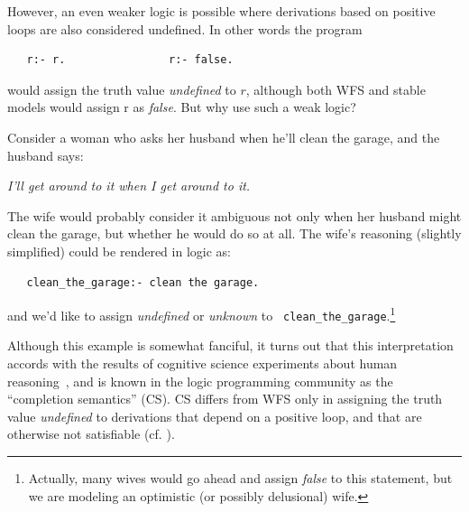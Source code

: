 However, an even weaker logic is possible where derivations based on
positive loops are also considered undefined.  In other words the
program
\begin{verbatim}
   r:- r.                r:- false.
\end{verbatim}
would assign the truth value {\em undefined} to $r$, although both WFS
and stable models would assign r as {\em false}.  But why use such a
weak logic?

Consider a woman who asks her husband when he'll clean the garage, and
the husband says:

{\em I'll get around to it when I get around to it.}

The wife would probably consider it ambiguous not only when her
husband might clean the garage, but whether he would do so at all.
The wife's reasoning (slightly simplified) could be rendered in logic
as:

\begin{verbatim}
   clean_the_garage:- clean the garage.
\end{verbatim}
\noindent
and we'd like to assign {\em undefined} or {\em unknown} to {\tt
  clean\_the\_garage}.\footnote{Actually, many wives would go ahead
  and assign {\em false} to this statement, but we are modeling an
  optimistic (or possibly delusional) wife.}

Although this example is somewhat fanciful, it turns out that this
interpretation accords with the results of cognitive science
experiments about human reasoning~\cite{SteV08}, and is known in the
logic programming community as the ``completion semantics'' (CS).  CS
differs from WFS only in assigning the truth value {\em undefined} to
derivations that depend on a positive loop, and that are otherwise not
satisfiable (cf. \cite{Lloy84}).


